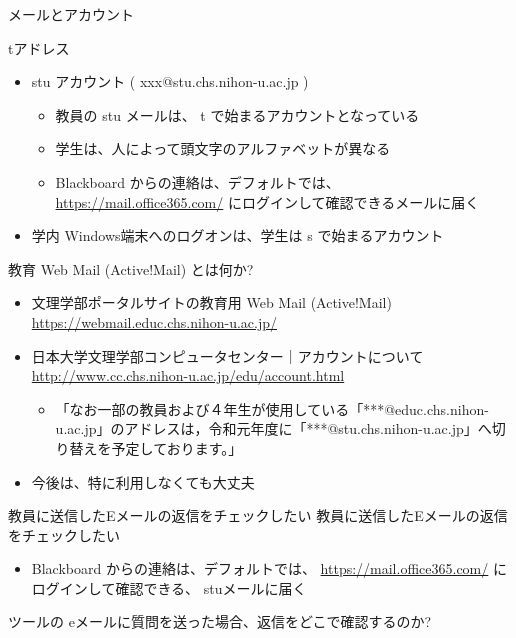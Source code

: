 \documentclass[a4j,10pt]{jsarticle}
\begin{document}
{\begin{frame}[label={sec:org4aad05a},fragile]{メールとアカウント}
\begin{block}{tアドレス}
\begin{itemize}
\item stu アカウント ( xxx@stu.chs.nihon-u.ac.jp )
\begin{itemize}
\item 教員の stu メールは、 t で始まるアカウントとなっている
\item 学生は、人によって頭文字のアルファベットが異なる
\item Blackboard からの連絡は、デフォルトでは、
\url{https://mail.office365.com/}
にログインして確認できるメールに届く
\end{itemize}
\item 学内 Windows端末へのログオンは、学生は s で始まるアカウント
\end{itemize}
\end{block}
\par
\begin{block}{教育 Web Mail (Active!Mail) とは何か?}
\begin{itemize}
\item 文理学部ポータルサイトの教育用 Web Mail (Active!Mail)
\url{https://webmail.educ.chs.nihon-u.ac.jp/}
\par
\item 日本大学文理学部コンピュータセンター｜アカウントについて
\url{http://www.cc.chs.nihon-u.ac.jp/edu/account.html}
\begin{itemize}
\item 「なお一部の教員および４年生が使用している「***@educ.chs.nihon-u.ac.jp」のアドレスは，令和元年度に「***@stu.chs.nihon-u.ac.jp」へ切り替えを予定しております。」
\end{itemize}
\par
\item 今後は、特に利用しなくても大丈夫
\end{itemize}
\end{block}
\par
\begin{block}{教員に送信したEメールの返信をチェックしたい}
教員に送信したEメールの返信をチェックしたい
\par
\begin{itemize}
\item Blackboard からの連絡は、デフォルトでは、
\url{https://mail.office365.com/}
にログインして確認できる、 stuメールに届く
\end{itemize}
\end{block}
\par
\begin{block}{ツールの eメールに質問を送った場合、返信をどこで確認するのか?}
\begin{itemize}

\end{itemize}
\end{block}
\end{frame}}
\end{document}
